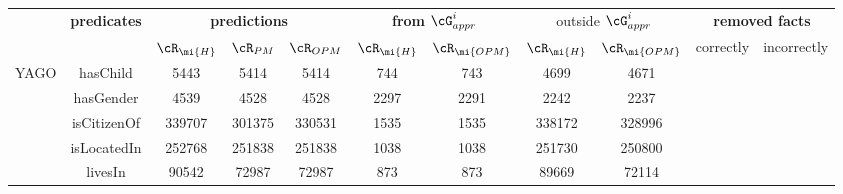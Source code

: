 
\begin{tabular}{|c|c|c|c|c|c|c|c|c|c|c|}
\hline
 \multirow{2}{*}{}              &   \multirow{2}{*}{\textbf{predicates}}         & \multicolumn{3}{c|}{\textbf{predictions}} & \multicolumn{2}{c|}{\textbf{from} $\cG^i_{appr}$} & \multicolumn{2}{c|}{outside $\cG^i_{appr}$} & \multicolumn{2}{c|}{\textbf{removed facts}} \\ \cline{3-11} 
         &  & $\cR_\mi{H}$  & $\cR_{PM}$  & $\cR_{OPM}$     &  $\cR_\mi{H}$     & $\cR_{\mi{OPM}}$ & $\cR_\mi{H}$     & $\cR_{\mi{OPM}}$            & correctly    & incorrectly   \\ \hline
\multirow{5}{*}{YAGO} &     hasChild       &    5443    & 5414  &  5414                &   744    &   743   &    4699           &    4671            &              &               \\ \cline{2-11}
 &     hasGender       &  4539      &  4528  & 4528                           &   2297    &   2291   &     2242          &    2237            &              &               \\ \cline{2-11}
 &     isCitizenOf       &  339707      &  301375  & 330531                           &   1535    &   1535   &     338172          &    328996            &              &               \\ \cline{2-11}
 &     isLocatedIn       &  252768      & 251838 &   251838                  &    1038   &   1038   &     251730          &    250800            &              &              
\\ \cline{2-11}
 &     livesIn       &  90542      & 72987 &   72987                  &    873   &   873   &     89669          &    72114            &              &              

\end{tabular}
